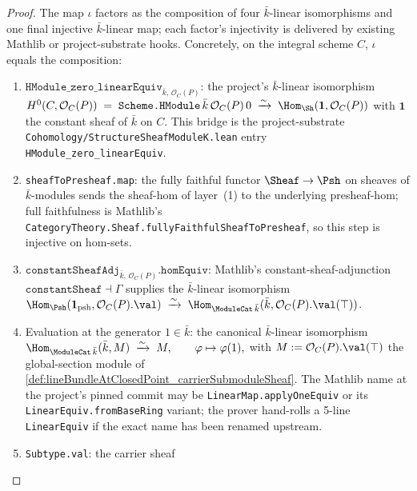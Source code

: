 \begin{proof}
  The map \(\iota\) factors as the composition of four \(\bar k\)-linear
  isomorphisms and one final injective \(\bar k\)-linear map; each
  factor's injectivity is delivered by existing Mathlib or
  project-substrate hooks. Concretely, on the integral scheme \(C\),
  \(\iota\) equals the composition:
  \begin{enumerate}
    \item \(\texttt{HModule\_zero\_linearEquiv}_{\bar k,\,\mathcal O_C(P)}\):
      the project's $\bar k$-linear isomorphism
      $H^0(C, \mathcal O_C(P)) \;=\; \texttt{Scheme.HModule}\,
      \bar k\,\mathcal O_C(P)\,0
        \;\xrightarrow{\sim}\;
        \Hom_{\Sh}(\mathbf 1, \mathcal O_C(P))$
      with \(\mathbf 1\) the constant sheaf of \(\bar k\) on \(C\). This
      bridge is the project-substrate
      \texttt{Cohomology/StructureSheafModuleK.lean} entry
      \texttt{HModule\_zero\_linearEquiv}.
    \item \texttt{sheafToPresheaf.map}: the fully faithful functor
      \(\Sheaf \to \Psh\) on sheaves of \(\bar k\)-modules sends the
      sheaf-hom of layer~(1) to the underlying presheaf-hom; full
      faithfulness is Mathlib's
      \texttt{CategoryTheory.Sheaf.fullyFaithfulSheafToPresheaf}, so
      this step is injective on hom-sets.
    \item \(\texttt{constantSheafAdj}_{\bar k,\,\mathcal O_C(P)}.\texttt{homEquiv}\):
      Mathlib's constant-sheaf-adjunction
      \(\texttt{constantSheaf} \dashv \Gamma\) supplies the
      \(\bar k\)-linear isomorphism
      $\Hom_{\Psh}(\mathbf 1_{\mathrm{psh}}, \mathcal O_C(P).\val)
       \;\xrightarrow{\sim}\;
       \Hom_{\ModuleCat\,\bar k}(\bar k, \mathcal O_C(P).\val(\top))$.
    \item Evaluation at the generator \(1\in\bar k\): the canonical
      \(\bar k\)-linear isomorphism
      $\Hom_{\ModuleCat\,\bar k}(\bar k, M)
       \;\xrightarrow{\sim}\;
       M, \qquad \varphi \mapsto \varphi(1),$
      with \(M:=\mathcal O_C(P).\val(\top)\) the global-section module
      of \cref{def:lineBundleAtClosedPoint_carrierSubmoduleSheaf}. The
      Mathlib name at the project's pinned commit may be
      \texttt{LinearMap.applyOneEquiv} or its
      \texttt{LinearEquiv.fromBaseRing} variant; the prover hand-rolls
      a 5-line \texttt{LinearEquiv} if the exact name has been
      renamed upstream.
    \item \texttt{Subtype.val}: the carrier sheaf

\end{enumerate}
\end{proof}

